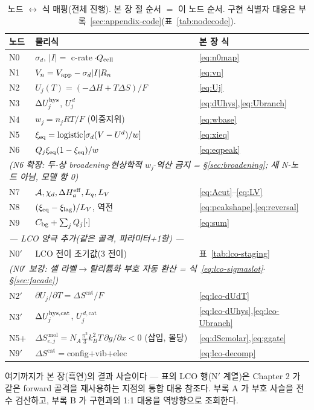 \begin{table}[t]
\centering
\renewcommand{\arraystretch}{1.3}
\caption{노드 $\leftrightarrow$ 식 매핑(전체 진행). 본 장 절 순서 $=$ 이 노드 순서.
구현 식별자 대응은 부록~\ref{sec:appendix-code}(표~\ref{tab:nodecode}).}
\label{tab:nodemap}
\begin{tabular}{l l l}
\toprule
노드 & 물리식 & 본 장 식 \\
\midrule
N0 & $\sigma_d$, $|I|=$ c-rate$\,\cdot Q_{\mathrm{cell}}$ & \eqref{eq:n0map} \\
N1 & $V_n=V_{\mathrm{app}}-\sigma_d|I|R_n$ & \eqref{eq:vn} \\
N2 & $U_j(T)=(-\Delta H+T\Delta S)/F$ & \eqref{eq:Uj} \\
N3 & $\Delta U_j^{\mathrm{hys}}$, $U_j^{\,d}$ & \eqref{eq:dUhys},\eqref{eq:Ubranch} \\
N4 & $w_j=n_jRT/F$ (이중지위) & \eqref{eq:wbase} \\
N5 & $\xi_{\mathrm{eq}}=\mathrm{logistic}[\sigma_d(V-U^d)/w]$ & \eqref{eq:xieq} \\
N6 & $Q_j\xi_{\mathrm{eq}}(1-\xi_{\mathrm{eq}})/w$ & \eqref{eq:eqpeak} \\
\multicolumn{3}{l}{\emph{\quad(N6 확장: 두-상 broadening$\cdot$현상학적 $w_j$$\cdot$역산 금지 = \S\ref{sec:broadening}; 새 N-노드 아님, 모델 항 0)}}\\
N7 & $\mathcal A,\chi_d,\Delta H_a^{\mathrm{eff}},L_q,L_V$ & \eqref{eq:Acut}--\eqref{eq:LV} \\
N8 & $(\xi_{\mathrm{eq}}-\xi_\mathrm{lag})/L_V$, 역전 & \eqref{eq:peakshape},\eqref{eq:reversal} \\
N9 & $C_{\mathrm{bg}}+\sum_jQ_j[\cdot]$ & \eqref{eq:sum} \\
\midrule
\multicolumn{3}{l}{\emph{— LCO 양극 추가(같은 골격, 파라미터+1항) —}}\\
N0$'$ & LCO 전이 초기값(3 전이) & 표~\ref{tab:lco-staging} \\
\multicolumn{3}{l}{\emph{\quad(N0$'$ 보강: 셀 라벨$\to$탈리튬화 부호 자동 환산 = 식~\eqref{eq:lco-sigmaslot}$\cdot$\S\ref{sec:facade})}}\\
N2$'$ & $\partial U_j/\partial T=\Delta S^\mathrm{cat}/F$ & \eqref{eq:lco-dUdT} \\
N3$'$ & $\Delta U_j^{\mathrm{hys},\mathrm{cat}}$, $U_j^{\,d,\mathrm{cat}}$ & \eqref{eq:lco-dUhys},\eqref{eq:lco-Ubranch} \\
N5$+$ & $\Delta S_{e,j}^{\,\mathrm{mol}}=N_A\tfrac{\pi^2}{3}k_B^2T\,\partial g/\partial x<0$ (삽입, 몰당) & \eqref{eq:dSemolar},\eqref{eq:ggate} \\
N9$'$ & $\Delta S^\mathrm{cat}=$config$+$vib$+$elec & \eqref{eq:lco-decomp} \\
\bottomrule
\end{tabular}
\end{table}

여기까지가 본 장(흑연)의 결과 사슬이다 --- 표의 LCO 행(N$'$ 계열)은 Chapter 2 가 같은 forward 골격을
재사용하는 지점의 통합 대응 참조다. 부록 A 가 부호 사슬을
전수 검산하고, 부록 B 가 구현과의 1:1 대응을 역방향으로 조회한다.

